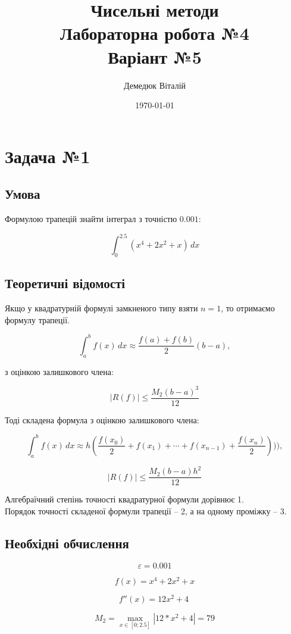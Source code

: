 \documentclass[a4paper, 12pt]{article}
\author{Демедюк Віталій}
\title{Чисельні методи\\
	   Лабораторна робота №4\\
	   Варіант №5}
\date{\today}
\begin{document}
\maketitle

\newpage
\tableofcontents

\newpage
\section{Задача №1}

\subsection{Умова}

Формулою трапецій знайти інтеграл з точністю $0.001$:

\[ \int_{0}^{2.5}(x^4+2x^2+x)\,dx\]

\subsection{Теоретичні відомості}

Якщо у квадратурній формулі замкненого типу взяти $n = 1$, то отримаємо формулу трапеції.

\[ \int_{a}^{b}f(x)\,dx \approx \frac{f(a)+f(b)}{2}(b-a), \]

з оцінкою залишкового члена:

\[ |R(f)| \leq \frac{M_2(b-a)^3}{12} \]

Тоді складена формула з оцінкою залишкового члена:

\[ \int_{a}^{b}f(x)\,dx \approx h(\frac{f(x_0)}{2} + f(x_1) + \cdots + f(x_{n-1}) + \frac{f(x_n)}{2}))), \]

\[ |R(f)| \leq \frac{M_2(b-a)h^2}{12} \]

Алгебраїчний степінь точності квадратурної формули дорівнює 1. \\ Порядок точності складеної формули трапеції -- 2, а на одному проміжку -- 3.

\subsection{Необхідні обчислення}

\[ \varepsilon = 0.001 \]

\[ f(x) = x^4+2x^2+x \]

\[ f''(x) = 12x^2 + 4\ \]

\[ M_2 = \max_{x \in [0; 2.5]}|12*x^2 + 4| = 79\]
\end{document}
